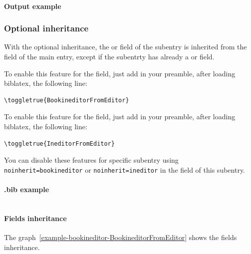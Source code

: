 \documentclass{ltxdockit}[2011/03/25]
\begin{document}
 
\paragraph{Output example}

\begin{quotation}
  \cite{BHG226}
  
  \cite{BHG225}
\end{quotation}
\subsubsection{Optional inheritance}

With the optional inheritance, the  or  field of the subentry is inherited from the  field of the main entry, except if the subentrty has already a  or  field.


To enable this feature for the  field, just add in your preamble, after loading biblatex, the following line:
\begin{verbatim}
\toggletrue{BookineditorFromEditor}
\end{verbatim}

To enable this feature for the  field, just add in your preamble, after loading biblatex, the following line:
\begin{verbatim}
\toggletrue{IneditorFromEditor}
\end{verbatim}

You can disable these features for specific subentry using \verb+noinherit=bookineditor+ or \verb`noinherit=ineditor` in the  field of this subentry.

\paragraph{.bib example}

\inputminted[breaklines]{latex}{example-bookineditor-BookineditorFromEditor.bib}

\paragraph{Fields inheritance}

The graph~\ref{example-bookineditor-BookineditorFromEditor} shows the fields inheritance.
\end{document}
